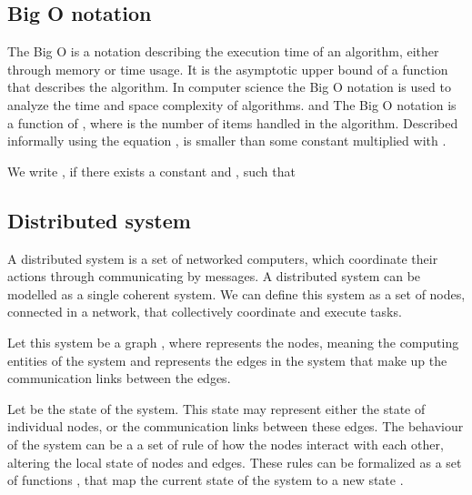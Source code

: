 

\subsection{Big O notation}

 The Big O is a notation describing the execution time of an algorithm, either through memory or time usage. It is the asymptotic upper bound of a function that describes the algorithm. In computer science the Big O notation is used to analyze the time and space complexity of algorithms. and The Big O notation is a function of , where  is the number of items handled in the algorithm. Described informally using the equation ,  is smaller than some constant multiplied with .

 \begin{definition}
 We write , if there exists a constant
  and , such that 
 \end{definition}
\subsection{Distributed system}

A distributed system is a set of networked computers, which coordinate their actions through communicating by messages. A distributed system can be modelled as a single coherent system. We can define this system as a set of nodes, connected in a network, that collectively coordinate and execute tasks.

Let this system be a graph  , where  represents the nodes, meaning the computing entities of the system and  represents the edges in the system that make up the communication links between the edges.

Let  be the state of the system. This state may represent either the state of individual nodes, or the communication links between these edges. The behaviour of the system can be a a set of rule of how the nodes interact with each other, altering the local state of nodes and edges. These rules can be formalized as a set of functions , that map the current state of the system  to a new state .

